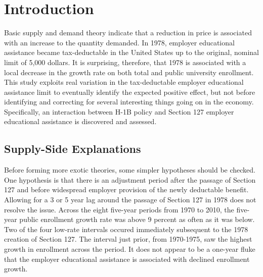 \documentclass[review]{elsarticle}
\begin{document}
\pagebreak
\linenumbers
        
    \section{Introduction}

    Basic supply and demand theory indicate that a reduction in price is associated with an increase to the quantity demanded.
    In 1978, employer educational assistance became tax-deductable in the United States up to the original, nominal limit of 5,000 dollars.
    It is surprising, therefore, that 1978 is associated with a local decrease in the growth rate on both total and public university enrollment.
    This study exploits real variation in the tax-deductable employer educational assistance limit to eventually identify the expected positive effect,
    but not before identifying and correcting for several interesting things going on in the economy.
    Specifically, an interaction between H-1B policy and Section 127 employer educational assistance is discovered and assessed.

    \subsection{Supply-Side Explanations}
    Before forming more exotic theories, some simpler hypotheses should be checked.
    One hypothesis is that there is an adjustment period after the passage of Section 127 and before widespread employer provision of the newly deductable benefit.
    Allowing for a 3 or 5 year lag around the passage of Section 127 in 1978 does not resolve the issue.
    Across the eight five-year periods from 1970 to 2010, the five-year public enrollment growth rate was above 9 percent as often as it was below.
    Two of the four low-rate intervals occured immediately subsequent to the 1978 creation of Section 127.
    The interval just prior, from 1970-1975, saw the highest growth in enrollment across the period.
    It does not appear to be a one-year fluke that the employer educational assistance is associated with declined enrollment growth.
\end{document}
